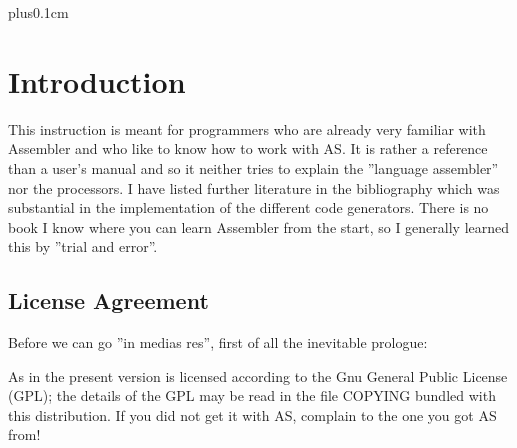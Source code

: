 \documentclass[12pt,twoside]{report}
\newcommand{\asname}{{AS}}
\begin{document}
{\parskip 0cm plus0.1cm \tableofcontents}


\cleardoublepage
\chapter{Introduction}

This instruction is meant for programmers who are already very familiar
with Assembler and who like to know how to work with \asname{}.  It is rather a
reference than a user's manual and so it neither tries to explain the
''language assembler'' nor the processors.  I have listed further
literature in the bibliography which was substantial in the implementation
of the different code generators.  There is no book I know where you can
learn Assembler from the start, so I generally learned this by ''trial and
error''.



\section{License Agreement}
\label{SectLicense}

Before we can go ''in medias res'', first of all the inevitable prologue:

As in the present version is licensed according to the Gnu General Public
License (GPL); the details of the GPL may be read in the file COPYING
bundled with this distribution.  If you did not get it with \asname{}, complain
to the one you got \asname{} from!
\end{document}
